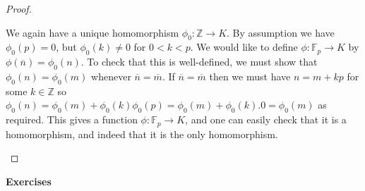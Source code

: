 \documentclass{amsart}
\newcommand{\Z}         {{\mathbb{Z}}}
\newcommand{\F}         {{\mathbb{F}}}
\newcommand{\ov}[1]     {\overline{#1}}
\renewcommand{\:}{\colon}
\theoremstyle{definition}
\begin{document}
\begin{proof}
\begin{itemize}
   We again have a unique homomorphism $\phi_0\:\Z\to K$.  By
   assumption we have $\phi_0(p)=0$, but $\phi_0(k)\neq 0$ for
   $0<k<p$.  We would like to define $\phi\:\F_p\to K$ by
   $\phi(\ov{n})=\phi_0(n)$.  To check that this is well-defined, we
   must show that $\phi_0(n)=\phi_0(m)$ whenever $\ov{n}=\ov{m}$.  If
   $\ov{n}=\ov{m}$ then we must have $n=m+kp$ for some $k\in\Z$ so
   $\phi_0(n)=\phi_0(m)+\phi_0(k)\phi_0(p)=\phi_0(m)+\phi_0(k).0=\phi_0(m)$
   as required.  This gives a function $\phi\:\F_p\to K$, and one can
   easily check that it is a homomorphism, and indeed that it is the
   only homomorphism. 
 \end{itemize}
\end{proof}



\begin{center}
 \Large \textbf{Exercises}
\end{center}
\end{document}
